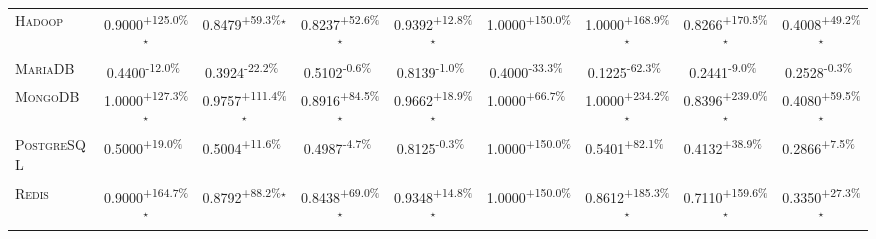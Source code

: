 \begin{table}[htbp]
\begin{tabular}{l|cccc|cccc}
\textsc{Hadoop} & \cellcolor{green!30}0.9000\textsuperscript{+125.0\%}$^\star$ & \cellcolor{green!30}0.8479\textsuperscript{+59.3\%}$^\star$ & \cellcolor{green!30}0.8237\textsuperscript{+52.6\%}$^\star$ & \cellcolor{green!30}0.9392\textsuperscript{+12.8\%}$^\star$ & \cellcolor{green!30}1.0000\textsuperscript{+150.0\%}$^{\,\,\,}$ & \cellcolor{green!30}1.0000\textsuperscript{+168.9\%}$^\star$ & \cellcolor{green!30}0.8266\textsuperscript{+170.5\%}$^\star$ & \cellcolor{green!30}0.4008\textsuperscript{+49.2\%}$^\star$ \\
\textsc{MariaDB} & \cellcolor{red!30}0.4400\textsuperscript{-12.0\%}$^{\,\,\,}$ & \cellcolor{red!30}0.3924\textsuperscript{-22.2\%}$^{\,\,\,}$ & \cellcolor{red!30}0.5102\textsuperscript{-0.6\%}$^{\,\,\,}$ & \cellcolor{red!30}0.8139\textsuperscript{-1.0\%}$^{\,\,\,}$ & \cellcolor{red!30}0.4000\textsuperscript{-33.3\%}$^{\,\,\,}$ & \cellcolor{red!30}0.1225\textsuperscript{-62.3\%}$^{\,\,\,}$ & \cellcolor{red!30}0.2441\textsuperscript{-9.0\%}$^{\,\,\,}$ & \cellcolor{red!30}0.2528\textsuperscript{-0.3\%}$^{\,\,\,}$ \\
\textsc{MongoDB} & \cellcolor{green!30}1.0000\textsuperscript{+127.3\%}$^\star$ & \cellcolor{green!30}0.9757\textsuperscript{+111.4\%}$^\star$ & \cellcolor{green!30}0.8916\textsuperscript{+84.5\%}$^\star$ & \cellcolor{green!30}0.9662\textsuperscript{+18.9\%}$^\star$ & \cellcolor{green!30}1.0000\textsuperscript{+66.7\%}$^{\,\,\,}$ & \cellcolor{green!30}1.0000\textsuperscript{+234.2\%}$^\star$ & \cellcolor{green!30}0.8396\textsuperscript{+239.0\%}$^\star$ & \cellcolor{green!30}0.4080\textsuperscript{+59.5\%}$^\star$ \\
\textsc{PostgreSQL} & \cellcolor{green!30}0.5000\textsuperscript{+19.0\%}$^{\,\,\,}$ & \cellcolor{green!30}0.5004\textsuperscript{+11.6\%}$^{\,\,\,}$ & \cellcolor{red!30}0.4987\textsuperscript{-4.7\%}$^{\,\,\,}$ & \cellcolor{red!30}0.8125\textsuperscript{-0.3\%}$^{\,\,\,}$ & \cellcolor{green!30}1.0000\textsuperscript{+150.0\%}$^{\,\,\,}$ & \cellcolor{green!30}0.5401\textsuperscript{+82.1\%}$^{\,\,\,}$ & \cellcolor{green!30}0.4132\textsuperscript{+38.9\%}$^{\,\,\,}$ & \cellcolor{green!30}0.2866\textsuperscript{+7.5\%}$^{\,\,\,}$ \\
\textsc{Redis} & \cellcolor{green!30}0.9000\textsuperscript{+164.7\%}$^\star$ & \cellcolor{green!30}0.8792\textsuperscript{+88.2\%}$^\star$ & \cellcolor{green!30}0.8438\textsuperscript{+69.0\%}$^\star$ & \cellcolor{green!30}0.9348\textsuperscript{+14.8\%}$^\star$ & \cellcolor{green!30}1.0000\textsuperscript{+150.0\%}$^{\,\,\,}$ & \cellcolor{green!30}0.8612\textsuperscript{+185.3\%}$^\star$ & \cellcolor{green!30}0.7110\textsuperscript{+159.6\%}$^\star$ & \cellcolor{green!30}0.3350\textsuperscript{+27.3\%}$^\star$ \\

\end{tabular}
\end{table}
